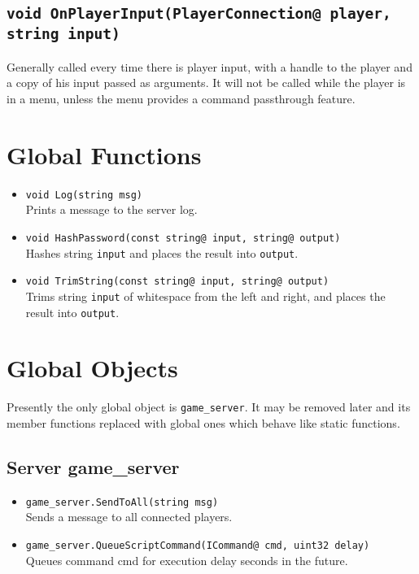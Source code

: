 \documentclass{book}
\begin{document}
\subsection{\texttt{void OnPlayerInput(PlayerConnection@ player, string input)}}
  Generally called every time there is player input, with a handle to the player
  and a copy of his input passed as arguments. It will not be called while the
  player is in a menu, unless the menu provides a command passthrough feature.

\section{Global Functions}
\begin{itemize}
\item \texttt{void Log(string msg)}\\
  Prints a message to the server log.
\item \texttt{void HashPassword(const string@ input, string@ output)}\\
  Hashes string \texttt{input} and places the result into \texttt{output}.
\item \texttt{void TrimString(const string@ input, string@ output)}\\
  Trims string \texttt{input} of whitespace from the left and right, and places
  the result into \texttt{output}.
\end{itemize}

\section{Global Objects}
Presently the only global object is \texttt{game\_server}. It may be removed
later and its member functions replaced with global ones which behave like
static functions.

\subsection{Server game\_server}
\begin{itemize}
\item \texttt{game\_server.SendToAll(string msg)}\\
  Sends a message to all connected players.

\item \texttt{game\_server.QueueScriptCommand(ICommand@ cmd, uint32 delay)}\\
  Queues command cmd for execution delay seconds in the future.
\end{itemize}
\end{document}
